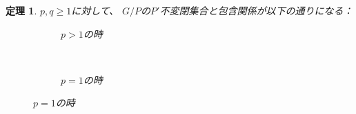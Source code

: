 \documentclass[12pt]{msjproc} %
\newtheorem{theorem}{定理}
\begin{document}
\begin{theorem}
$p, q \geqslant 1$に対して、
  $G/P$の$P'$不変閉集合と{包含関係}が以下の通りになる：\\
  \begin{figure}[H]
	  
    \centering
    \begin{subfigure}{0.3\textwidth}
	\caption{$p>1$の時}
    \end{subfigure}
    ~ %
    \begin{subfigure}{0.3\textwidth}
	\raisebox{40mm}
	{}
	\caption{$p=1$の時}
    \end{subfigure}
\end{figure}
\end{theorem}
\end{document}
